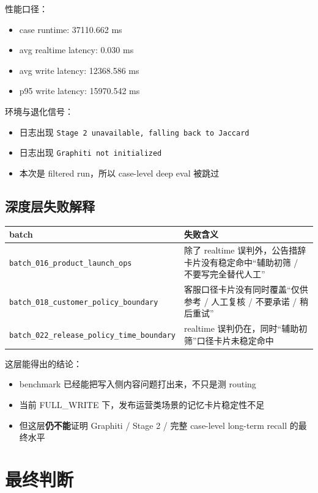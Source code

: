 \documentclass[11pt]{article}
\begin{document}
性能口径：
\begin{itemize}
\item case runtime: 37110.662 ms
\item avg realtime latency: 0.030 ms
\item avg write latency: 12368.586 ms
\item p95 write latency: 15970.542 ms
\end{itemize}

环境与退化信号：
\begin{itemize}
\item 日志出现 \texttt{Stage 2 unavailable, falling back to Jaccard}
\item 日志出现 \texttt{Graphiti not initialized}
\item 本次是 filtered run，所以 case-level deep eval 被跳过
\end{itemize}

\subsection{深度层失败解释}

\begin{tabularx}{\textwidth}{@{}lX@{}}
\toprule
\textbf{batch} & \textbf{失败含义} \\
\midrule
\texttt{batch\_016\_product\_launch\_ops} & 除了 realtime 误判外，公告措辞卡片没有稳定命中“辅助初筛 / 不要写完全替代人工” \\
\texttt{batch\_018\_customer\_policy\_boundary} & 客服口径卡片没有同时覆盖“仅供参考 / 人工复核 / 不要承诺 / 稍后重试” \\
\texttt{batch\_022\_release\_policy\_time\_boundary} & realtime 误判仍在，同时“辅助初筛”口径卡片未稳定命中 \\
\bottomrule
\end{tabularx}

这层能得出的结论：
\begin{itemize}
\item benchmark 已经能把写入侧内容问题打出来，不只是测 routing
\item 当前 FULL\_WRITE 下，发布运营类场景的记忆卡片稳定性不足
\item 但这层\textbf{仍不能}证明 Graphiti / Stage 2 / 完整 case-level long-term recall 的最终水平
\end{itemize}

\section{最终判断}
\end{document}
